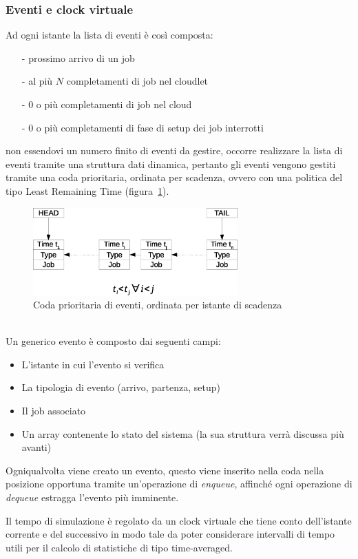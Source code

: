 \subsubsection{Eventi e clock virtuale}
Ad ogni istante la lista di eventi è così composta:
\begin{itemize}
\item[-]prossimo arrivo di un job
\item[-]al più $N$ completamenti di job nel cloudlet
\item[-]$0$ o più completamenti di job nel cloud
\item[-]$0$ o più completamenti di fase di setup dei job interrotti
\end{itemize}
non essendovi un numero finito di eventi da gestire, occorre realizzare la lista
di eventi tramite una struttura dati dinamica, pertanto gli eventi vengono
gestiti tramite una coda prioritaria, ordinata per scadenza, ovvero con una
politica del tipo Least Remaining Time (figura~\ref{eventq}).
%
\begin{figure}[!h]
\centering
\includegraphics[width=0.7\textwidth]{figures/eventq}
\caption{Coda prioritaria di eventi, ordinata per istante di scadenza}
\label{eventq}
\end{figure}
%
\\Un generico evento è composto dai seguenti campi:
\begin{itemize}
\item L’istante in cui l’evento si verifica
\item La tipologia di evento (arrivo, partenza, setup)
\item Il job associato
\item Un array contenente lo stato del sistema (la sua struttura verrà discussa
più avanti)
\end{itemize}
%
Ogniqualvolta viene creato un evento, questo viene inserito nella coda nella
posizione opportuna tramite un’operazione di \emph{enqueue}, affinché ogni 
operazione di \emph{dequeue} estragga l’evento più imminente.

Il tempo di simulazione è regolato da un clock virtuale che tiene conto
dell’istante corrente e del successivo in modo tale da poter considerare
intervalli di tempo utili per il calcolo di statistiche di tipo time-averaged.

